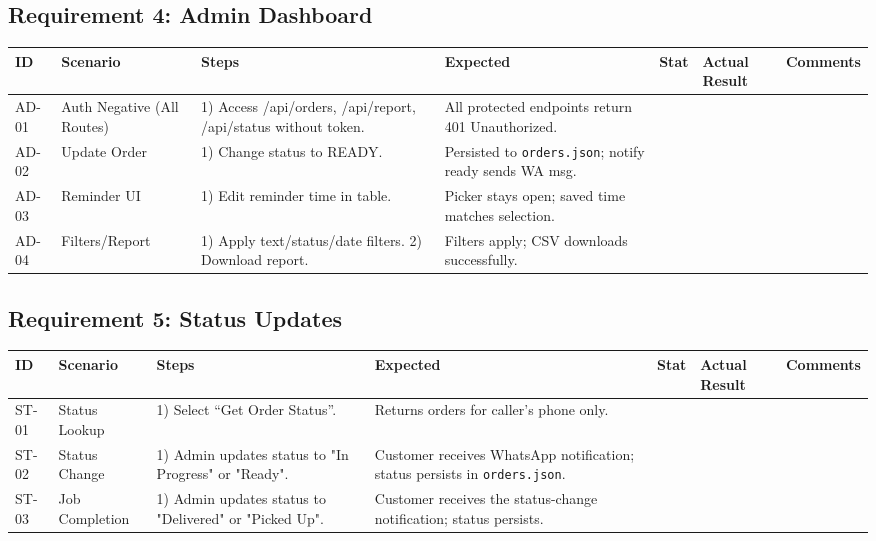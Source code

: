 ﻿\documentclass[11pt, a4paper]{article}
\begin{document}
\subsection{Requirement 4: Admin Dashboard}
\begin{longtable}{|p{}|p{}|p{}|p{}|p{}|p{}|p{}|}
    \hline
    \rowcolor{headergray} \textbf{ID} & \textbf{Scenario} & \textbf{Steps} & \textbf{Expected} & \textbf{Stat} & \textbf{Actual Result} & \textbf{Comments} \\ \hline
    \endhead

    AD-01 & Auth Negative (All Routes) & 1) Access /api/orders, /api/report, /api/status without token. & All protected endpoints return 401 Unauthorized. & & & \\ \hline

    AD-02 & Update Order & 1) Change status to READY. & Persisted to \texttt{orders.json}; notify ready sends WA msg. & & & \\ \hline

    AD-03 & Reminder UI & 1) Edit reminder time in table. & Picker stays open; saved time matches selection. & & & \\ \hline

    AD-04 & Filters/Report & 1) Apply text/status/date filters. 2) Download report. & Filters apply; CSV downloads successfully. & & & \\ \hline
\end{longtable}

\subsection{Requirement 5: Status Updates}
\begin{longtable}{|p{}|p{}|p{}|p{}|p{}|p{}|p{}|}
    \hline
    \rowcolor{headergray} \textbf{ID} & \textbf{Scenario} & \textbf{Steps} & \textbf{Expected} & \textbf{Stat} & \textbf{Actual Result} & \textbf{Comments} \\ \hline
    \endhead

    ST-01 & Status Lookup & 1) Select “Get Order Status”. & Returns orders for caller’s phone only. & & & \\ \hline

    ST-02 & Status Change & 1) Admin updates status to "In Progress" or "Ready". & Customer receives WhatsApp notification; status persists in \texttt{orders.json}. & & & \\ \hline

    ST-03 & Job Completion & 1) Admin updates status to "Delivered" or "Picked Up". & Customer receives the status-change notification; status persists. & & & \\ \hline
\end{longtable}
\end{document}
